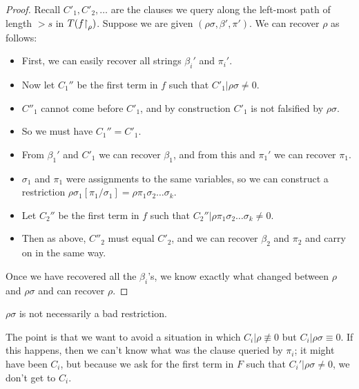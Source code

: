 \begin{proof}

Recall \( C'_1, C'_2, \dots \) are the clauses we query along the left-most path of length \( >s \) in \( T(f{\upharpoonright}_{\rho}) \).
Suppose we are given \( (\rho\sigma, \beta', \pi') \). We can recover \( \rho \) as follows:

\begin{itemize}
    \item First, we can easily recover all strings \( \beta_i' \) and \( \pi_i' \).
    \item Now let \( C_1'' \) be the first term in \( f \) such that \( C'_1|\rho\sigma \neq 0 \).
    \item \( C''_1 \) cannot come before \( C'_1 \), and by construction \( C'_1 \) is not falsified by \( \rho\sigma \).
    \item So we must have \( C_1'' = C'_1 \).
    \item From \( \beta_1' \) and \( C'_1 \) we can recover \( \beta_1 \), and from this and \( \pi_1' \) we can recover \( \pi_1 \).
    \item \( \sigma_1 \) and \( \pi_1 \) were assignments to the same variables, so we can construct a restriction \( \rho\sigma_1[\pi_1/\sigma_1] = \rho\pi_1\sigma_2 \dots \sigma_k \).
    \item Let \( C_2'' \) be the first term in \( f \) such that \( C_2'' | \rho\pi_1\sigma_2 \dots \sigma_k \neq 0 \).
    \item Then as above, \( {C''_2} \) must equal \( C'_2 \), and we can recover \( \beta_2 \) and \( \pi_2 \) and carry on in the same way.

\end{itemize}
 
Once we have recovered all the \( \beta_i \)'s, we know exactly what changed between \( \rho \) and \( \rho\sigma \) and can recover \( \rho \).
\end{proof} 

\begin{note}
\( \rho\sigma \) is not necessarily a bad restriction.
\end{note}
\begin{note}
\noindent
The point is that we want to avoid a situation in which \( C_i | \rho \not\equiv 0 \) but \( C_i | \rho\sigma \equiv 0 \). If this happens, then we can't know what was the clause queried by \( \pi_i \); it might have been \( C_i \), but because we ask for the first term in \( F \) such that \( C_i' | \rho\sigma \neq 0 \), we don't get to \( C_i \).
\end{note}

